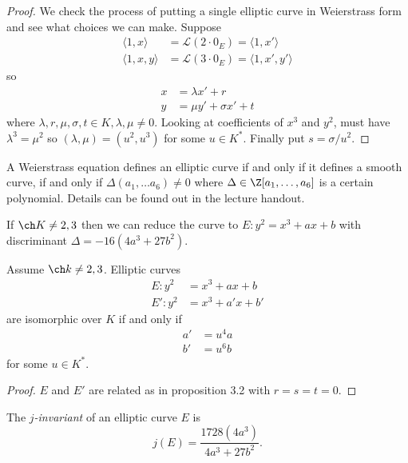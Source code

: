 \documentclass[a4paper]{article}
\theoremstyle{definition}
\theoremstyle{theorem}
\begin{document}
\begin{proof}
  We check the process of putting a single elliptic curve in Weierstrass form and see what choices we can make. Suppose
  \begin{align*}
    \langle 1, x \rangle &= \mathcal L(2 \cdot 0_E) = \langle 1, x' \rangle \\
    \langle 1, x, y \rangle &= \mathcal L(3 \cdot 0_E) = \langle 1, x', y' \rangle
  \end{align*}
  so
  \begin{align*}
    x &= \lambda x' + r \\
    y &= \mu y' + \sigma x' + t
  \end{align*}
  where \(\lambda, r, \mu, \sigma, t \in K, \lambda, \mu \neq 0\). Looking at coefficients of \(x^3\) and \(y^2\), must have \(\lambda^3 = \mu^2\) so \((\lambda, \mu) = (u^2, u^3)\) for some \(u \in K^*\). Finally put \(s = \sigma/u^2\).
\end{proof}

A Weierstrass equation defines an elliptic curve if and only if it defines a smooth curve, if and only if \(\Delta(a_1, \dots a_6) \neq 0\) where \(\Delta \in \Z[a_1, \dots, a_6]\) is a certain polynomial. Details can be found out in the lecture handout.

If \(\ch K \neq 2, 3\) then we can reduce the curve to \(E: y^2 = x^3 + ax + b\) with discriminant \(\Delta = -16(4a^3 + 27b^2)\).

\begin{corollary}
  Assume \(\ch k \neq 2, 3\). Elliptic curves
  \begin{align*}
    E: y^2 &= x^3 + ax + b \\
    E': y^2 &= x^3 + a'x + b'
  \end{align*}
  are isomorphic over \(K\) if and only if
  \begin{align*}
    a' &= u^4a \\
    b' &= u^6b
  \end{align*}
  for some \(u \in K^*\).
\end{corollary}

\begin{proof}
  \(E\) and \(E'\) are related as in proposition 3.2 with \(r = s = t = 0\).
\end{proof}

\begin{definition}[\(j\)-invariant]
  The \emph{\(j\)-invariant} of an elliptic curve \(E\) is
  \[
    j(E) = \frac{1728 (4a^3)}{4a^3 + 27b^2}.
  \]
\end{definition}
\end{document}
